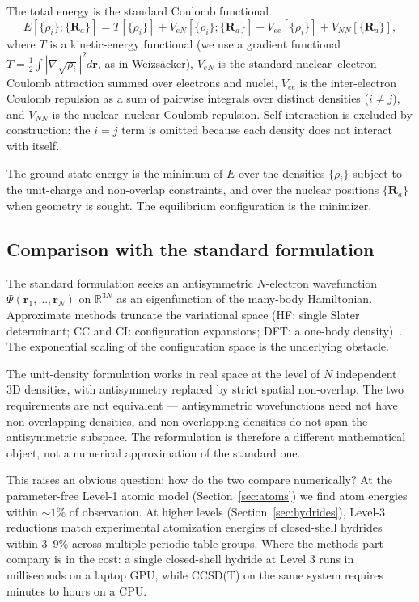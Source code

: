 \documentclass[11pt]{article}
\begin{document}
The total energy is the standard Coulomb functional
\begin{equation}
E[\{\rho_i\}; \{\mathbf{R}_a\}] = T[\{\rho_i\}] + V_{eN}[\{\rho_i\}; \{\mathbf{R}_a\}] + V_{ee}[\{\rho_i\}] + V_{NN}[\{\mathbf{R}_a\}],
\end{equation}
where $T$ is a kinetic-energy functional (we use a gradient functional $T = \tfrac{1}{2} \int |\nabla \sqrt{\rho_i}|^2 d\mathbf{r}$, as in Weizs\"acker), $V_{eN}$ is the standard nuclear--electron Coulomb attraction summed over electrons and nuclei, $V_{ee}$ is the inter-electron Coulomb repulsion as a sum of pairwise integrals over distinct densities ($i \neq j$), and $V_{NN}$ is the nuclear--nuclear Coulomb repulsion. Self-interaction is excluded by construction: the $i = j$ term is omitted because each density does not interact with itself.

The ground-state energy is the minimum of $E$ over the densities $\{\rho_i\}$ subject to the unit-charge and non-overlap constraints, and over the nuclear positions $\{\mathbf{R}_a\}$ when geometry is sought. The equilibrium configuration is the minimizer.

\subsection{Comparison with the standard formulation}

The standard formulation seeks an antisymmetric $N$-electron wavefunction $\Psi(\mathbf{r}_1, \ldots, \mathbf{r}_N)$ on $\mathbb{R}^{3N}$ as an eigenfunction of the many-body Hamiltonian. Approximate methods truncate the variational space (HF: single Slater determinant; CC and CI: configuration expansions; DFT: a one-body density)~\cite{KS65,MHG17}. The exponential scaling of the configuration space is the underlying obstacle.

The unit-density formulation works in real space at the level of $N$ independent 3D densities, with antisymmetry replaced by strict spatial non-overlap. The two requirements are not equivalent --- antisymmetric wavefunctions need not have non-overlapping densities, and non-overlapping densities do not span the antisymmetric subspace. The reformulation is therefore a different mathematical object, not a numerical approximation of the standard one.

This raises an obvious question: how do the two compare numerically? At the parameter-free Level-1 atomic model (Section~\ref{sec:atoms}) we find atom energies within ${\sim}1\%$ of observation. At higher levels (Section~\ref{sec:hydrides}), Level-3 reductions match experimental atomization energies of closed-shell hydrides within 3--9\% across multiple periodic-table groups. Where the methods part company is in the cost: a single closed-shell hydride at Level 3 runs in milliseconds on a laptop GPU, while CCSD(T) on the same system requires minutes to hours on a CPU.
\end{document}
